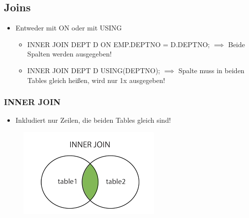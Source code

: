 \subsection{Joins}
\begin{itemize}
    \item Entweder mit ON oder mit USING
    \begin{itemize}
        \item INNER JOIN DEPT D ON EMP.DEPTNO = D.DEPTNO; $\implies$ Beide Spalten werden ausgegeben!
        \item INNER JOIN DEPT D USING(DEPTNO); $\implies$ Spalte muss in beiden Tables gleich heißen, wird nur 1x ausgegeben!
    \end{itemize}
\end{itemize}

\subsubsection{INNER JOIN}
\begin{itemize}
    \item Inkludiert nur Zeilen, die beiden Tables gleich sind!
\end{itemize}
\begin{figure}[H]
    \centering
    \includegraphics{res/themenkorb_2/joins_inner_join.png} 
\end{figure}

